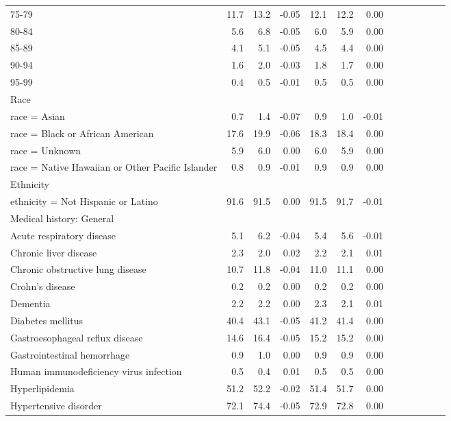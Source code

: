 \documentclass[11pt,]{article}
\begin{document}
\begin{longtable}{lrrrrrrrrrrrr}
      75-79 & 11.7 & 13.2 & -0.05 & 12.1 & 12.2 &  0.00 \\ 
      80-84 &  5.6 &  6.8 & -0.05 &  6.0 &  5.9 &  0.00 \\ 
      85-89 &  4.1 &  5.1 & -0.05 &  4.5 &  4.4 &  0.00 \\ 
      90-94 &  1.6 &  2.0 & -0.03 &  1.8 &  1.7 &  0.00 \\ 
      95-99 &  0.4 &  0.5 & -0.01 &  0.5 &  0.5 &  0.00 \\ 
  Race &    &    &     &    &    &     \\ 
      race = Asian &  0.7 &  1.4 & -0.07 &  0.9 &  1.0 & -0.01 \\ 
      race = Black or African American & 17.6 & 19.9 & -0.06 & 18.3 & 18.4 &  0.00 \\ 
      race = Unknown &  5.9 &  6.0 &  0.00 &  6.0 &  5.9 &  0.00 \\ 
      race = Native Hawaiian or Other Pacific Islander &  0.8 &  0.9 & -0.01 &  0.9 &  0.9 &  0.00 \\ 
  Ethnicity &    &    &     &    &    &     \\ 
      ethnicity = Not Hispanic or Latino & 91.6 & 91.5 &  0.00 & 91.5 & 91.7 & -0.01 \\ 
  Medical history: General &    &    &     &    &    &     \\ 
      Acute respiratory disease &  5.1 &  6.2 & -0.04 &  5.4 &  5.6 & -0.01 \\ 
      Chronic liver disease &  2.3 &  2.0 &  0.02 &  2.2 &  2.1 &  0.01 \\ 
      Chronic obstructive lung disease & 10.7 & 11.8 & -0.04 & 11.0 & 11.1 &  0.00 \\ 
      Crohn's disease &  0.2 &  0.2 &  0.00 &  0.2 &  0.2 &  0.00 \\ 
      Dementia &  2.2 &  2.2 &  0.00 &  2.3 &  2.1 &  0.01 \\ 
      Diabetes mellitus & 40.4 & 43.1 & -0.05 & 41.2 & 41.4 &  0.00 \\ 
      Gastroesophageal reflux disease & 14.6 & 16.4 & -0.05 & 15.2 & 15.2 &  0.00 \\ 
      Gastrointestinal hemorrhage &  0.9 &  1.0 &  0.00 &  0.9 &  0.9 &  0.00 \\ 
      Human immunodeficiency virus infection &  0.5 &  0.4 &  0.01 &  0.5 &  0.5 &  0.00 \\ 
      Hyperlipidemia & 51.2 & 52.2 & -0.02 & 51.4 & 51.7 &  0.00 \\ 
      Hypertensive disorder & 72.1 & 74.4 & -0.05 & 72.9 & 72.8 &  0.00 \\ 

\end{longtable}
\end{document}
